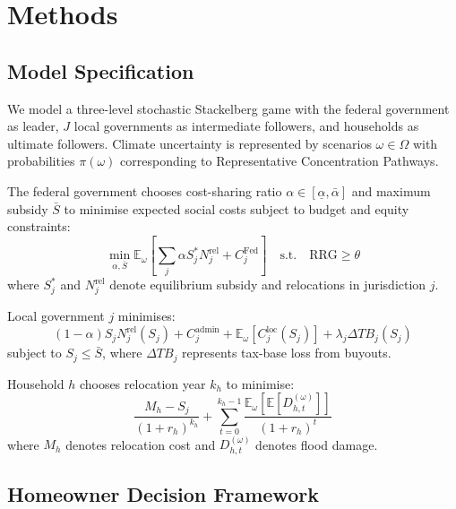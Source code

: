 \documentclass[12pt,a4paper]{article}
\begin{document}

\section{Methods}\label{sec:methods}

\subsection{Model Specification}

We model a three-level stochastic Stackelberg game with the federal government as leader, $J$ local governments as intermediate followers, and households as ultimate followers. Climate uncertainty is represented by scenarios $\omega \in \Omega$ with probabilities $\pi(\omega)$ corresponding to Representative Concentration Pathways.

The federal government chooses cost-sharing ratio $\alpha \in [\underline{\alpha}, \bar{\alpha}]$ and maximum subsidy $\bar{S}$ to minimise expected social costs subject to budget and equity constraints:
\begin{equation}
\min_{\alpha, \bar{S}} \mathbb{E}_\omega\left[\sum_{j} \alpha S_j^* N_j^{\text{rel}} + C_j^{\text{Fed}}\right] \quad \text{s.t.} \quad \text{RRG} \geq \theta
\label{eq:federal}
\end{equation}
where $S_j^*$ and $N_j^{\text{rel}}$ denote equilibrium subsidy and relocations in jurisdiction $j$.

Local government $j$ minimises:
\begin{equation}
(1-\alpha) S_j N_j^{\text{rel}}(S_j) + C_j^{\text{admin}} + \mathbb{E}_\omega[C_j^{\text{loc}}(S_j)] + \lambda_j \Delta TB_j(S_j)
\label{eq:local}
\end{equation}
subject to $S_j \leq \bar{S}$, where $\Delta TB_j$ represents tax-base loss from buyouts.

Household $h$ chooses relocation year $k_h$ to minimise:
\begin{equation}
\frac{M_h - S_j}{(1+r_h)^{k_h}} + \sum_{t=0}^{k_h-1} \frac{\mathbb{E}_\omega[\mathbb{E}[D_{h,t}^{(\omega)}]]}{(1+r_h)^t}
\label{eq:household}
\end{equation}
where $M_h$ denotes relocation cost and $D_{h,t}^{(\omega)}$ denotes flood damage.

\subsection{Homeowner Decision Framework}
\end{document}
